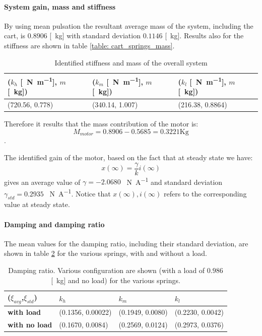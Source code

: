 \paragraph{System gain, mass and  stiffness}
By using   mean pulsation the resultant average mass of the system, including the cart, is $ 0.8906$ [\SI{}{\kilo\gram}] with standard deviation $  0.1146$ [\SI{}{\kilo \gram}]. Results also for the stiffness  are shown in table \ref{table: cart_springs_mass}.
\begin{table}[!h]
\centering
\label{table: cart_attached_springs_mass}
\begin{tabular}{|l|l|l|}
\hline
{\textbf{($k_h$ [\SI{}{\newton \per \metre}], $m$ [\SI{}{\kilo \gram}])}} & \textbf{($k_m$ [\SI{}{\newton \per \metre}], $m$ [\SI{}{\kilo \gram}])} & \textbf{($k_l$ [\SI{}{\newton \per \metre}], $m$ [\SI{}{\kilo \gram}])} \\ \hline
(720.56, 0.778)              & (340.14, 1.007)     & (216.38, 0.8864)     \\ \hline
\end{tabular}
\caption{Identified stiffness and mass of the overall system}
\end{table}
Therefore it results that the mass contribution of the motor is:
$$M_{motor} = 0.8906 -0.5685=0.3221 \text{Kg}$$.

The identified gain of the motor, based on the fact that at steady state we have:
$$x(\infty) = \frac{\gamma}{k} i(\infty)$$
gives an average value of $\gamma=  -2.0680$ \SI{}{\newton \per \ampere} and standard deviation $\gamma_{std}= 0.2935$ \SI{}{\newton \per \ampere}. Notice that $x(\infty), i(\infty)$ refers to the corresponding value at steady state.


\paragraph{Damping and damping ratio}
The mean values for the damping ratio, including their standard deviation, are shown in table \ref{table: cart_attached_dampingratio} for the various springs, with and without a load.
\begin{table}[!h]
\centering

\label{table: cart_attached_dampingratio}
\begin{tabular}{|l|l|l|l|}
\hline
{(\textbf{$\xi_{avg}$},$\xi_{std}$)} & \textbf{$k_h$} & \textbf{$k_m$}   & \textbf{$k_l$}   \\ \hline
\textbf{with load}         & (0.1356,  0.00022)    & (0.1949, 0.0080) & (0.2230, 0.0042) \\ \hline
\textbf{with no load}      & (0.1670, 0.0084)    & (0.2569, 0.0124) & (0.2973, 0.0376)      \\ \hline
\end{tabular}
\caption{Damping ratio. Various configuration are shown (with a load of $0.986$ [\SI{}{\kilo \gram}] and no load) for the various springs. }
\end{table}


